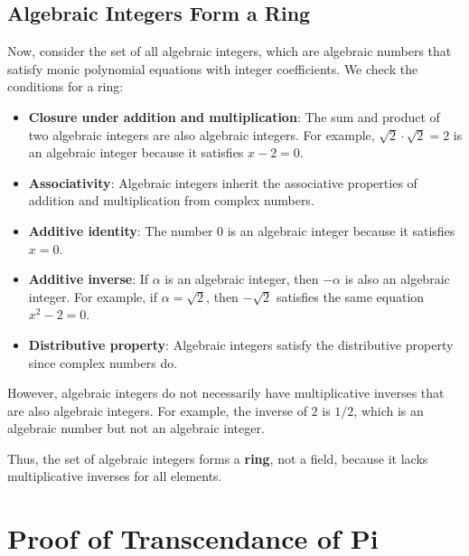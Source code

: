 \documentclass{article}
\newenvironment{proofbox}
  {\begin{mdframed}[linewidth=1pt,linecolor=black,backgroundcolor=white]\noindent\ignorespaces}
  {\end{mdframed}}
\begin{document}
\begin{proofbox}
    \subsection*{Algebraic Integers Form a Ring}
    Now, consider the set of all algebraic integers, which are algebraic numbers that satisfy monic polynomial equations with integer coefficients. We check the conditions for a ring:
    
    \begin{itemize}
        \item \textbf{Closure under addition and multiplication}: The sum and product of two algebraic integers are also algebraic integers. For example, \( \sqrt{2} \cdot \sqrt{2} = 2 \) is an algebraic integer because it satisfies \( x - 2 = 0 \).
        
        \item \textbf{Associativity}: Algebraic integers inherit the associative properties of addition and multiplication from complex numbers.
        
        \item \textbf{Additive identity}: The number \( 0 \) is an algebraic integer because it satisfies \( x = 0 \).
        
        \item \textbf{Additive inverse}: If \( \alpha \) is an algebraic integer, then \( -\alpha \) is also an algebraic integer. For example, if \( \alpha = \sqrt{2} \), then \( -\sqrt{2} \) satisfies the same equation \( x^2 - 2 = 0 \).
        
        \item \textbf{Distributive property}: Algebraic integers satisfy the distributive property since complex numbers do.
    \end{itemize}
    
    However, algebraic integers do not necessarily have multiplicative inverses that are also algebraic integers. For example, the inverse of \( 2 \) is \( 1/2 \), which is an algebraic number but not an algebraic integer.
    
    Thus, the set of algebraic integers forms a \textbf{ring}, not a field, because it lacks multiplicative inverses for all elements.
    
\end{proofbox}

\section{Proof of Transcendance of Pi }
\end{document}
